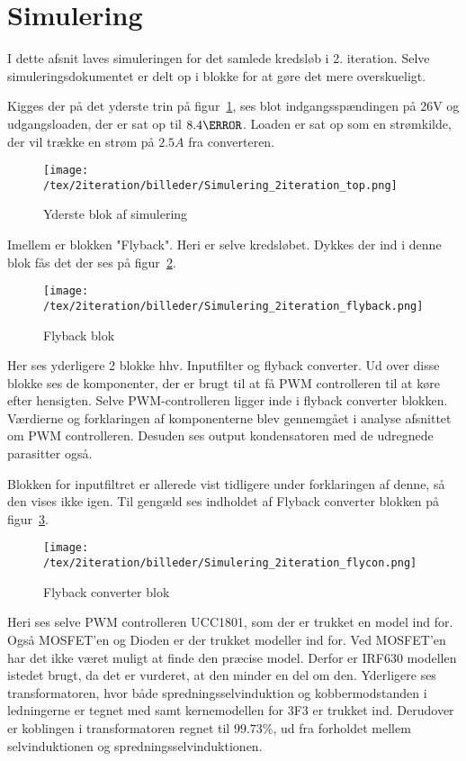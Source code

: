 \section{Simulering}

I dette afsnit laves simuleringen for det samlede kredsløb i 2. iteration. 
Selve simuleringsdokumentet er delt op i blokke for at gøre det mere overskueligt. 


\noindent Kigges der på det yderste trin på figur~\ref{fig: simtop}, ses blot indgangsspændingen på 26V og udgangsloaden, der er sat op til $8.4\ohm$. Loaden er sat op som en strømkilde, der vil trække en strøm på $2.5A$ fra converteren.
\begin{figure}[H]
	\center
	\texttt{[image: /tex/2iteration/billeder/Simulering\_2iteration\_top.png]}
	\caption{Yderste blok af simulering}
	\label{fig: simtop}
\end{figure}
Imellem er blokken "Flyback". Heri er selve kredsløbet. Dykkes der ind i denne blok fås det der ses på figur~\ref{fig: simfly}. 
\begin{figure}[H]
	\center
	\texttt{[image: /tex/2iteration/billeder/Simulering\_2iteration\_flyback.png]}
	\caption{Flyback blok}
	\label{fig: simfly}
\end{figure}
Her ses yderligere 2 blokke hhv. Inputfilter og flyback converter. Ud over disse blokke ses de komponenter, der er brugt til at få PWM controlleren til at køre efter hensigten. Selve PWM-controlleren ligger inde i flyback converter blokken. Værdierne og forklaringen af komponenterne blev gennemgået i analyse afsnittet om PWM controlleren.
Desuden ses output kondensatoren med de udregnede parasitter også.


\noindent Blokken for inputfiltret er allerede vist tidligere under forklaringen af denne, så den vises ikke igen. Til gengæld ses indholdet af Flyback converter blokken på figur~\ref{fig: simflycon}. 
\begin{figure}[H]
	\center
	\texttt{[image: /tex/2iteration/billeder/Simulering\_2iteration\_flycon.png]}
	\caption{Flyback converter blok}
	\label{fig: simflycon}
\end{figure}
Heri ses selve PWM controlleren UCC1801, som der er trukket en model ind for\cite{ucc1801-pspice}. Også MOSFET'en og Dioden er der trukket modeller ind for. Ved MOSFET'en har det ikke været muligt at finde den præcise model. Derfor er IRF630 modellen istedet brugt, da det er vurderet, at den minder en del om den\cite{IRF630}. 
Yderligere ses transformatoren, hvor både spredningsselvinduktion og kobbermodstanden i ledningerne er tegnet med samt kernemodellen for 3F3 er trukket ind. Derudover er koblingen i transformatoren regnet til $99.73\percent$, ud fra forholdet mellem selvinduktionen og spredningsselvinduktionen.


